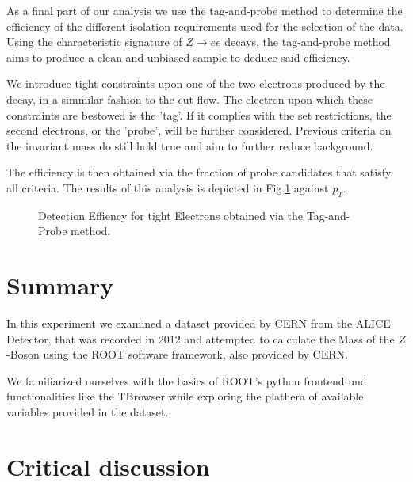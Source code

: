 \documentclass[11 pt]{article}
\begin{document}
As a final part of our analysis we use the tag-and-probe method to determine the efficiency of the different isolation requirements used for the selection of the data. Using the characteristic signature of $ Z \rightarrow ee$ decays, the tag-and-probe method aims to produce a clean and unbiased sample to deduce said efficiency.

We introduce tight constraints upon one of the two electrons produced by the decay, in a simmilar fashion to the cut flow. The electron upon which these constraints are bestowed is the 'tag'. If it complies with the set restrictions, the second electrons, or the 'probe', will be further considered. Previous criteria on the invariant mass do still hold true and aim to further reduce background.

The efficiency is then obtained via the fraction of probe candidates that satisfy all criteria. The results of this analysis is depicted in Fig.\ref{fig:detection_Efficiency} against $p_T$.

\begin{figure}[htbp]
    \centering

        \centering
    \caption{Detection Effiency for tight Electrons obtained via the Tag-and-Probe method.}
    \label{fig:detection_Efficiency}
\end{figure}

\section{Summary}
In this experiment we examined a dataset provided by CERN from the ALICE Detector, that was recorded in 2012 and attempted to calculate the Mass of the $Z$-Boson using the ROOT software framework, also provided by CERN.

We familiarized ourselves with the basics of ROOT's python frontend und functionalities like the TBrowser while exploring the plathera of available variables provided in the dataset. 
\section{Critical discussion}
\end{document}

